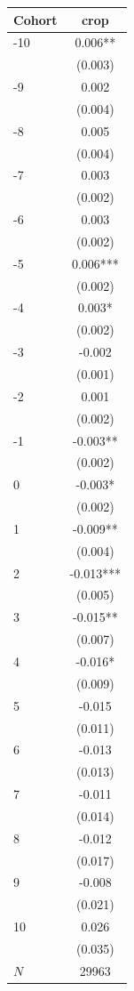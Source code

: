 {
\def\sym#1{\ifmmode^{#1}\else\(^{#1}\)\fi}
\begin{tabular}{l*{1}{c}}
\toprule
Cohort    &     crop   \\
\midrule
-10       &    0.006** \\
          &  (0.003)   \\
-9        &    0.002   \\
          &  (0.004)   \\
-8        &    0.005   \\
          &  (0.004)   \\
-7        &    0.003   \\
          &  (0.002)   \\
-6        &    0.003   \\
          &  (0.002)   \\
-5        &    0.006***\\
          &  (0.002)   \\
-4        &    0.003*  \\
          &  (0.002)   \\
-3        &   -0.002   \\
          &  (0.001)   \\
-2        &    0.001   \\
          &  (0.002)   \\
-1        &   -0.003** \\
          &  (0.002)   \\
0         &   -0.003*  \\
          &  (0.002)   \\
1         &   -0.009** \\
          &  (0.004)   \\
2         &   -0.013***\\
          &  (0.005)   \\
3         &   -0.015** \\
          &  (0.007)   \\
4         &   -0.016*  \\
          &  (0.009)   \\
5         &   -0.015   \\
          &  (0.011)   \\
6         &   -0.013   \\
          &  (0.013)   \\
7         &   -0.011   \\
          &  (0.014)   \\
8         &   -0.012   \\
          &  (0.017)   \\
9         &   -0.008   \\
          &  (0.021)   \\
10        &    0.026   \\
          &  (0.035)   \\
\midrule
\(N\)     &    29963   \\
\bottomrule
\end{tabular}
}
